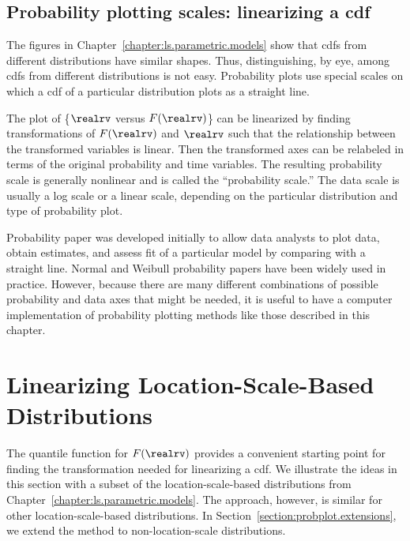 \subsection{Probability plotting scales: linearizing a cdf}

The figures in
Chapter~\ref{chapter:ls.parametric.models} 
show that cdfs from different
distributions have similar shapes.  Thus, distinguishing, by eye,
among cdfs from different distributions is not easy. Probability
plots use special scales on which a cdf of a particular
distribution plots as a straight line.

The plot of \{$\realrv$ versus $F(\realrv)$\} can be linearized
by finding transformations of $F(\realrv)$ and  $\realrv$
such that the relationship between the transformed variables is
linear.  Then the transformed axes can be relabeled in terms of the
original probability and time
variables. The resulting probability scale
is generally nonlinear and is called the ``probability scale.'' The
data scale is usually a log scale or a linear scale, depending on the
particular distribution and type of probability plot.

Probability paper was developed initially to allow data analysts
to plot data, obtain estimates,
and assess fit of a particular model by
comparing with a straight line.  Normal and Weibull probability papers
have been widely used in practice.
However, because there are many different
combinations of possible probability and data axes that might be
needed, it is useful to have a computer implementation of probability
plotting methods like those described in this chapter.

\section{Linearizing Location-Scale-Based Distributions}
\label{section:linearize.loc.scale}

The quantile function for $F(\realrv)$ provides a convenient
starting point for finding the transformation needed for linearizing a
cdf.  We illustrate the ideas in this section with a subset of the
location-scale-based distributions from
Chapter~\ref{chapter:ls.parametric.models}.  The approach, however, is
similar for other location-scale-based distributions. 
In Section~\ref{section:probplot.extensions}, we extend the method to
non-location-scale distributions.
